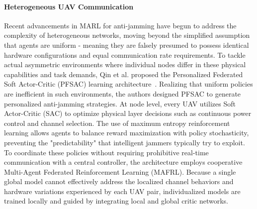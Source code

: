 \documentclass[conference]{IEEEtran}
\newcommand{\adm}[1]{{\color{orange}{[#1]}}}
\begin{document}
\paragraph{Heterogeneous UAV Communication} 
Recent advancements in MARL for anti-jamming have begun to address the complexity of heterogeneous networks, moving beyond the simplified assumption that agents are uniform - meaning they are falsely presumed to possess identical hardware configurations and equal communication rate requirements.
To tackle actual asymmetric environments where individual nodes differ in these physical capabilities and task demands, Qin et al. proposed the Personalized Federated Soft Actor-Critic (PFSAC) learning architecture~\cite{qin2025multi}.
Realizing that uniform policies are inefficient in such environments, the authors designed PFSAC to generate personalized anti-jamming strategies.
%
At node level, every UAV utilizes Soft Actor-Critic (SAC) to optimize physical layer decisions such as continuous power control and channel selection. 
The use of maximum entropy reinforcement learning allows agents to balance reward maximization with policy stochasticity, preventing the "predictability" that intelligent jammers typically try to exploit.
To coordinate these policies without requiring prohibitive real-time communication with a central controller, the architecture employs cooperative Multi-Agent Federated Reinforcement Learning (MAFRL). 
Because a single global model cannot effectively address the localized channel behaviors and hardware variations experienced by each UAV pair, individualized models are trained locally and guided by integrating local and global critic networks.
\end{document}

